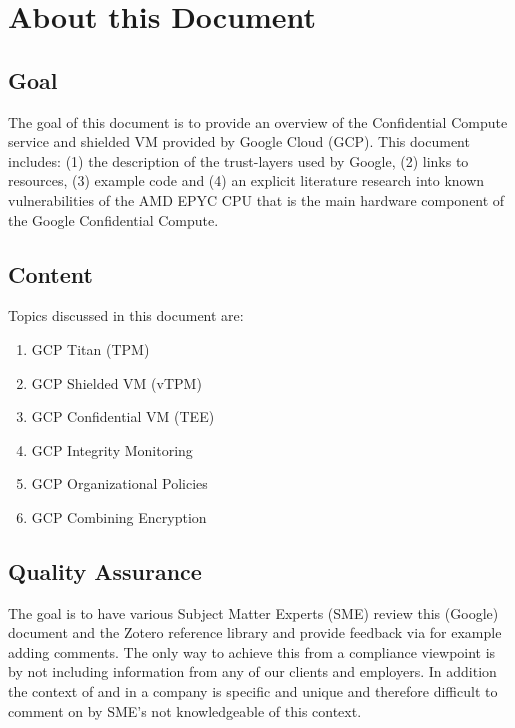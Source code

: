 
\section{About this Document}

 
\subsection{Goal}

The goal of this document is to provide an overview of the Confidential Compute service 
and shielded VM provided by Google Cloud (GCP). 
This document includes: 
(1) the description of the trust-layers used by Google, 
(2) links to resources, 
(3) example code and 
(4) an explicit literature research into known vulnerabilities of the AMD EPYC CPU 
that is the main hardware component of the Google Confidential Compute. 

\subsection{Content}

Topics discussed in this document are:
\begin{enumerate}
  \item GCP Titan (TPM)
  \item GCP Shielded VM (vTPM)
  \item GCP Confidential VM (TEE)
  \item GCP Integrity Monitoring
  \item GCP Organizational Policies
  \item GCP Combining Encryption
\end{enumerate}

\subsection{Quality Assurance}

The goal is to have various Subject Matter Experts (SME) review this (Google) document 
and the Zotero reference library and provide feedback via for example adding comments. 
The only way to achieve this from a compliance viewpoint is by not including information 
from any of our clients and employers. 
In addition the context of and in a company is specific and unique 
and therefore difficult to comment on by SME’s not knowledgeable of this context.

